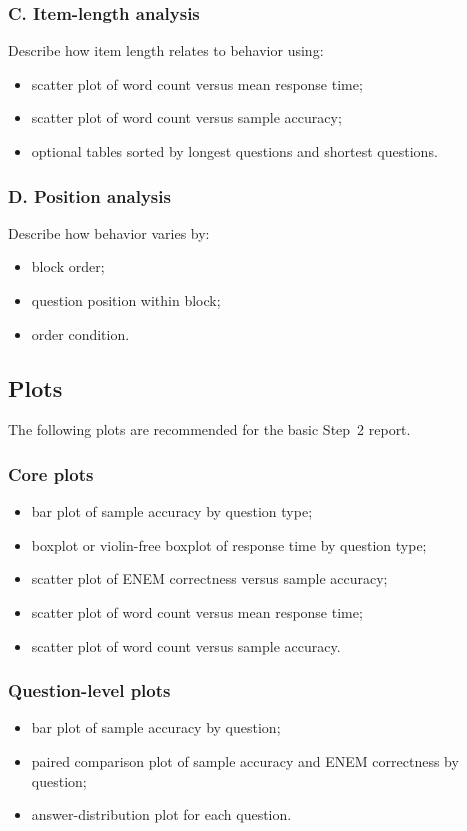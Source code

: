 \documentclass[11pt]{article}
\begin{document}
\subsubsection*{C. Item-length analysis}
Describe how item length relates to behavior using:
\begin{itemize}
    \item scatter plot of word count versus mean response time;
    \item scatter plot of word count versus sample accuracy;
    \item optional tables sorted by longest questions and shortest questions.
\end{itemize}

\subsubsection*{D. Position analysis}
Describe how behavior varies by:
\begin{itemize}
    \item block order;
    \item question position within block;
    \item order condition.
\end{itemize}

\subsection{Plots}
The following plots are recommended for the basic Step~2 report.

\subsubsection*{Core plots}
\begin{itemize}
    \item bar plot of sample accuracy by question type;
    \item boxplot or violin-free boxplot of response time by question type;
    \item scatter plot of ENEM correctness versus sample accuracy;
    \item scatter plot of word count versus mean response time;
    \item scatter plot of word count versus sample accuracy.
\end{itemize}

\subsubsection*{Question-level plots}
\begin{itemize}
    \item bar plot of sample accuracy by question;
    \item paired comparison plot of sample accuracy and ENEM correctness by question;
    \item answer-distribution plot for each question.
\end{itemize}
\end{document}
